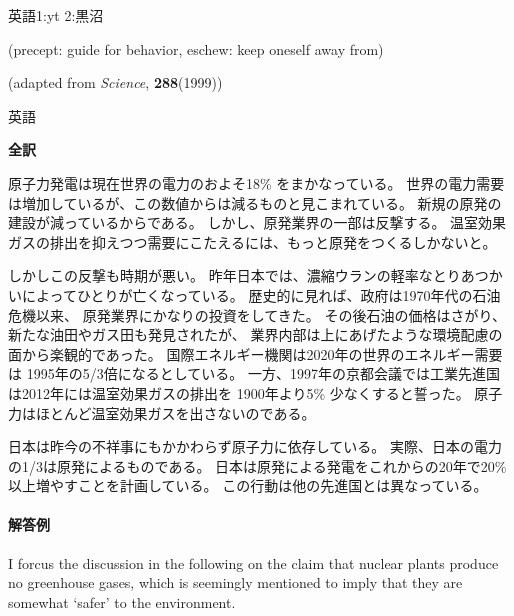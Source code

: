 \documentclass[fleqn]{jbook}
\begin{document}
\begin{question}{英語}{1:yt 2:黒沼}
\begin{subquestions}
\begin{flushright}

(precept: guide for behavior, eschew: keep oneself away from)

(adapted from \textit{Science}, \textbf{288}(1999))

\end{flushright}





\end{subquestions}
\end{question}
\begin{answer}{英語}{}

\begin{subanswers}
\SubAnswer 
\textbf{全訳}

原子力発電は現在世界の電力のおよそ18\% をまかなっている。
世界の電力需要は増加しているが、この数値からは減るものと見こまれている。
新規の原発の建設が減っているからである。
しかし、原発業界の一部は反撃する。%
温室効果ガスの排出を抑えつつ需要にこたえるには、もっと原発をつくるしかないと。

しかしこの反撃も時期が悪い。
昨年日本では、濃縮ウランの軽率なとりあつかいによってひとりが亡くなっている。
歴史的に見れば、政府は1970年代の石油危機以来、
原発業界にかなりの投資をしてきた。
その後石油の価格はさがり、新たな油田やガス田も発見されたが、
業界内部は上にあげたような環境配慮の面から楽観的であった。
国際エネルギー機関は2020年の世界のエネルギー需要は
1995年の5/3倍になるとしている。
一方、1997年の京都会議では工業先進国は2012年には温室効果ガスの排出を
1900年より5\% 少なくすると誓った。
原子力はほとんど温室効果ガスを出さないのである。

日本は昨今の不祥事にもかかわらず原子力に依存している。
実際、日本の電力の1/3は原発によるものである。
日本は原発による発電をこれからの20年で20\% 以上増やすことを計画している。
この行動は他の先進国とは異なっている。

\paragraph{解答例}

I forcus the discussion in the following on
the claim that nuclear plants produce no greenhouse gases,
which is seemingly mentioned to imply
that they are somewhat `safer' to the environment.


\end{subanswers}
\end{answer}
\end{document}

